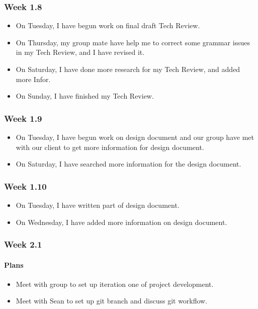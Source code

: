 \documentclass[onecolumn, draftclsnofoot,10pt, compsoc]{article}
\begin{document}
				\subsubsection{Week 1.8}
					\begin{itemize}
					\item On Tuesday, I have begun work on  final draft Tech Review.
					\item On Thursday, my group mate have help me to correct some grammar issues in my Tech Review, and I have revised it.
					\item On Saturday, I have  done more research for my Tech Review, and added more Infor.
					\item On Sunday, I have finished my Tech Review.
					\end{itemize}
				\subsubsection{Week 1.9}
					\begin{itemize}
					\item On Tuesday, I have begun work on design document and our group have met with our client to get more information for design document.
					\item On Saturday, I have searched more information for the design document.
					\end{itemize}
				\subsubsection{Week 1.10}
					\begin{itemize}
					\item On Tuesday, I have written part of design document.
					\item On Wednesday, I have added more information on design document.
					\end{itemize}

				\subsubsection{Week 2.1}
					\paragraph{Plans}
						\begin{itemize}
							\item Meet with group to set up iteration one of project development.
							\item Meet with Sean to set up git branch and discuss git workflow.
						\end{itemize}
\end{document}
